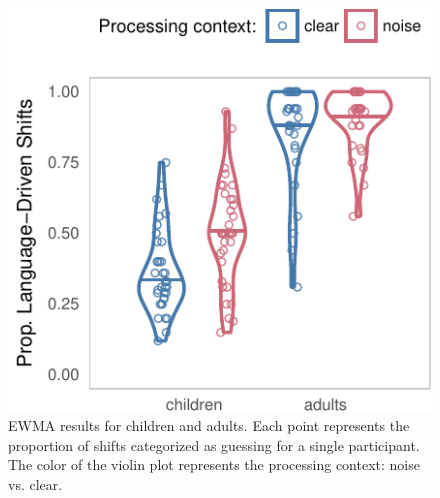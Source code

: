 \documentclass[10pt, letterpaper]{article}
\newenvironment{CodeChunk}{}{}
\begin{document}
\begin{CodeChunk}
\begin{figure}[t]

{\centering \includegraphics[width=0.85\linewidth]{figs/ewma_violin_plot-1} 

}

\caption[EWMA results for children and adults]{EWMA results for children and adults. Each point represents the proportion of shifts categorized as guessing for a single participant. The color of the violin plot represents the processing context: noise vs. clear.}\label{fig:ewma_violin_plot}
\end{figure}
\end{CodeChunk}
\end{document}
